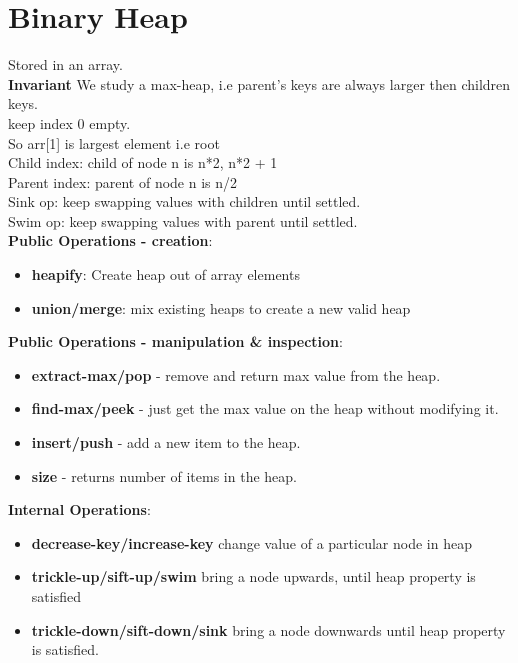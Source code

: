 \documentclass[10pt,a4paper]{article}
\begin{document}
	
	
	\section{Binary Heap}
	
	Stored in an array. \\

	\textbf{Invariant} We study a max-heap, i.e parent's keys are always larger then children keys. \\
	
	keep index 0 empty. \\
	So arr[1] is largest element i.e root\\
	
	Child index: child of node n is n*2, n*2 + 1\\
	Parent index: parent of node n is n/2\\
	
	Sink op: keep swapping values with children until settled.\\
	Swim op: keep swapping values with parent until settled.\\
	
	\textbf{Public Operations - creation}:
	\begin{itemize}
		\item \textbf{heapify}: Create heap out of array elements
		\item \textbf{union/merge}: mix existing heaps to create a new valid heap
	\end{itemize}
	\textbf{Public Operations - manipulation \& inspection}:
	\begin{itemize}
		\item \textbf{extract-max/pop} - remove and return max value from the heap.
		\item \textbf{find-max/peek} - just get the max value on the heap without modifying it.
		\item \textbf{insert/push} - add a new item to the heap.
		\item \textbf{size} - returns number of items in the heap.
	\end{itemize} 
	\textbf{Internal Operations}:
	\begin{itemize}
		\item \textbf{decrease-key/increase-key} change value of a particular node in heap
		\item \textbf{trickle-up/sift-up/swim} bring a node upwards, until heap property is satisfied
		\item \textbf{trickle-down/sift-down/sink} bring a node downwards until heap property is satisfied.
	\end{itemize}
	
\end{document}
